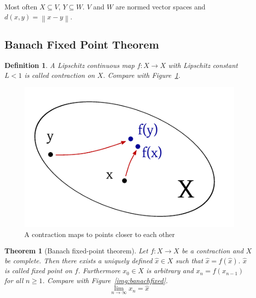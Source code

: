 \documentclass{article}
\newtheorem{theorem}{Theorem}  \numberwithin{theorem}{section}
\newtheorem{definition}{Definition}  \numberwithin{definition}{section}
\newcommand{\norm}[1]{\left\|#1\right\|}
\begin{document}
Most often $X \subseteq V$, $Y \subseteq W$. $V$ and $W$ are normed vector spaces and $d(x, y) = \norm{x - y}$.

\subsection{Banach Fixed Point Theorem}
\begin{definition} %
  A Lipschitz continuous map $f: X \to X$ with Lipschitz constant $L < 1$ is called \emph{contraction on $X$}. Compare with Figure~\ref{img:contraction}.
\end{definition}

\begin{figure}[t]
  \begin{center}
    \includegraphics{img/07_contraction.pdf}
    \caption{A contraction maps to points closer to each other}
    \label{img:contraction}
  \end{center}
\end{figure}

\begin{theorem}[Banach fixed-point theorem] %
  Let $f: X \to X$ be a contraction and $X$ be complete.
  Then there exists a uniquely defined $\hat{x} \in X$ such that $\hat{x} = f(\hat{x})$. $\hat{x}$ is called fixed point on $f$.
  Furthermore $x_0 \in X$ is arbitrary and $x_n = f(x_{n-1})$ for all $n \geq 1$. Compare with Figure~\ref{img:banachfixed}.
  \[ \lim_{n \to \infty} x_n = \hat{x} \]
\end{theorem}
\end{document}
